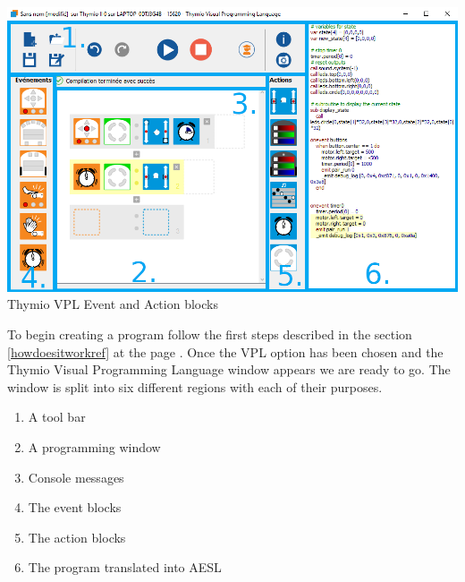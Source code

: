 \documentclass{scrbook}
\begin{document}
\begin{center}
  \includegraphics[width=\textwidth]{./VPL/Thymio_VPL_window}\\
  Thymio VPL Event and Action blocks
\end{center}

To begin creating a program follow the first steps described in the section \ref{howdoesitworkref} at the page \pageref{howdoesitworkref}. 
Once the VPL option has been chosen and the Thymio Visual Programming Language window appears we are ready to go. 
The window is split into six different regions with each of their purposes.
\begin{enumerate}
  \item A tool bar
  \item A programming window
  \item Console messages
  \item The event blocks
  \item The action blocks
  \item The program translated into AESL
\end{enumerate}
\end{document}
